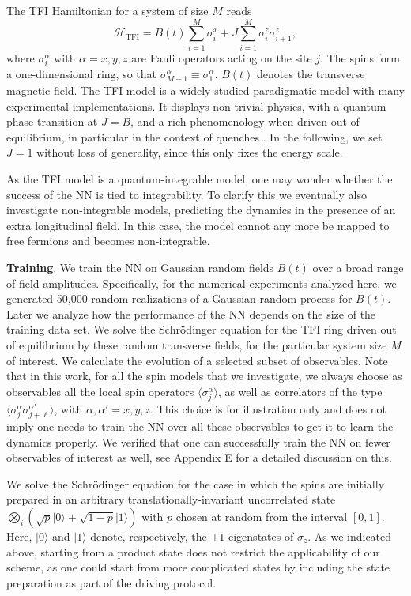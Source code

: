 \documentclass[a4paper,aps,amsmath,amssymb,twocolumn,longbibliography,,accepted=2022-05-17]{quantumarticle}
\begin{document}
The TFI Hamiltonian for a system of size $M$ reads
\begin{equation}
	\mathcal{H}_{\mathrm{TFI}}=B(t)\sum_{i=1}^{M}\sigma_{i}^{x}+J\sum_{i=1}^{M}\sigma_{i}^{z} \sigma_{i+1}^{z},
\end{equation}
where $\sigma_{i}^{\alpha}$ with $\alpha=x, y, z$ are Pauli operators acting on the site $j$. The spins form a one-dimensional ring, so that $\sigma_{M+1}^{\alpha} \equiv \sigma_{1}^{\alpha}$. $B(t)$ denotes the transverse magnetic field. The TFI model is a widely studied paradigmatic model with many experimental implementations. It displays non-trivial physics, with a quantum phase transition at $J=B$, and a rich phenomenology when driven out of equilibrium, in particular in the context of quenches \cite{chakrabarti2008quantum}. In the following, we set $J=1$ without loss of generality, since this only fixes the energy scale.

As the TFI model is a quantum-integrable model, one may wonder whether the success of the NN is tied to integrability. To clarify this we eventually also investigate non-integrable models, predicting the dynamics in the presence of an extra longitudinal field. In this case, the model cannot any more be mapped to free fermions and becomes non-integrable.


\textbf{Training}. We train the NN on Gaussian random fields $B(t)$ over a broad range of field amplitudes.  Specifically, for the numerical experiments analyzed here, we generated 50,000 random realizations of a Gaussian random process for $B(t)$. Later we analyze how the performance of the NN depends on the size of the training data set. We solve the Schr\"odinger equation for the TFI ring driven out of equilibrium by these random transverse fields, for the particular system size $M$ of interest. We calculate the evolution of a selected subset of observables. Note that in this work, for all the spin models that we investigate, we always choose as observables all the local spin operators $ \langle \sigma_{j}^{\alpha} \rangle$, as well as correlators of the type $\langle \sigma_{j}^{\alpha} \sigma_{j+\ell}^{\alpha'}\rangle$, with $\alpha, \alpha'=x, y, z$. This choice is for illustration only and does not imply one needs to train the NN over all these observables to get it to learn the dynamics properly. We verified that one can successfully train the NN on fewer observables of interest as well, see Appendix E for a detailed discussion on this.

We solve the Schr\"odinger equation for the case in which the spins are initially prepared in an arbitrary translationally-invariant uncorrelated state $\bigotimes_i(\sqrt{p}\vert 0 \rangle+\sqrt{1-p}\vert 1\rangle)$ with $p$ chosen at random from the interval $[0,1]$. Here, $|0\rangle$ and $|1\rangle$ denote, respectively, the $\pm 1$ eigenstates of $\sigma_z$. As we indicated above, starting from a product state does not restrict the applicability of our scheme, as one could start from more complicated states by including the state preparation as part of the driving protocol.
\end{document}
